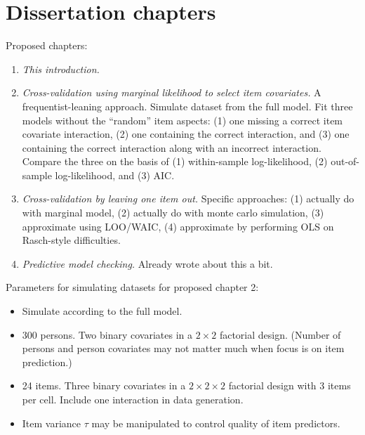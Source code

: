 \documentclass[12pt, letterpaper]{article}
\begin{document}
\section{Dissertation chapters}

Proposed chapters:
\begin{enumerate}
	\item \emph{This introduction.}
	\item \emph{Cross-validation using marginal likelihood to select item covariates.}
		A frequentist-leaning approach. Simulate dataset from the full model. Fit three models without the ``random'' item aspects: (1) one missing a correct item covariate interaction, (2) one containing the correct interaction, and (3) one containing the correct interaction along with an incorrect interaction. Compare the three on the basis of (1) within-sample log-likelihood, (2) out-of-sample log-likelihood, and (3) AIC.
	\item \emph{Cross-validation by leaving one item out.}
		Specific approaches: (1) actually do with marginal model, (2) actually do with monte carlo simulation, (3) approximate using LOO/WAIC, (4) approximate by performing OLS on Rasch-style difficulties.
	\item \emph{Predictive model checking.} Already wrote about this a bit.
\end{enumerate}

Parameters for simulating datasets for proposed chapter 2:
\begin{itemize}
	\item Simulate according to the full model.
	\item 300 persons. Two binary covariates in a $2 \times 2$ factorial design. (Number of persons and person covariates may not matter much when focus is on item prediction.)
	\item 24 items. Three binary covariates in a $2 \times 2 \times 2$ factorial design with 3 items per cell. Include one interaction in data generation.
	\item Item variance $\tau$ may be manipulated to control quality of item predictors.
\end{itemize}
\end{document}
